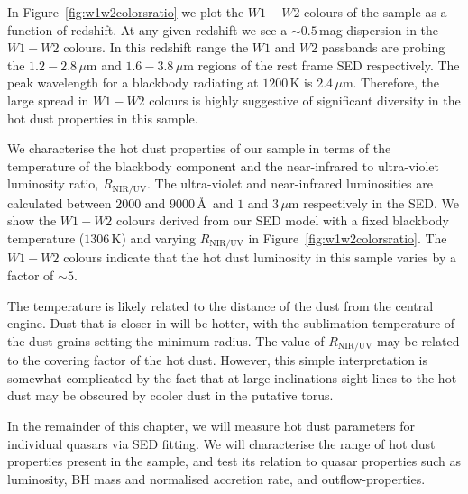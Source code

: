 In Figure~\ref{fig:w1w2colorsratio} we plot the $W1 - W2$ colours of the sample as a function of redshift. 
At any given redshift we see a $\sim 0.5$\,mag dispersion in the $W1-W2$ colours. 
In this redshift range the $W1$ and $W2$ passbands are probing the $1.2 - 2.8$\,$\mu$m and $1.6 - 3.8$\,$\mu$m regions of the rest frame SED respectively. 
The peak wavelength for a blackbody radiating at $1200$\,K is $2.4$\,$\mu$m.
Therefore, the large spread in $W1-W2$ colours is highly suggestive of significant diversity in the hot dust properties in this sample. 

We characterise the hot dust properties of our sample in terms of the temperature of the blackbody component and the near-infrared to ultra-violet luminosity ratio, $R_{\text{NIR/UV}}$. 
The ultra-violet and near-infrared luminosities are calculated between $2000$ and $9000$\,\AA\, and $1$ and $3$\,$\mu$m respectively in the SED.
We show the $W1-W2$ colours derived from our SED model with a fixed blackbody temperature ($1306$\,K) and varying $R_{\text{NIR/UV}}$ in Figure~\ref{fig:w1w2colorsratio}.
The $W1-W2$ colours indicate that the hot dust luminosity in this sample varies by a factor of $\sim5$. 

The temperature is likely related to the distance of the dust from the central engine.
Dust that is closer in will be hotter, with the sublimation temperature of the dust grains setting the minimum radius.  
The value of $R_{\text{NIR/UV}}$ may be related to the covering factor of the hot dust. 
However, this simple interpretation is somewhat complicated by the fact that at large inclinations sight-lines to the hot dust may be obscured by cooler dust in the putative torus. 

In the remainder of this chapter, we will measure hot dust parameters for individual quasars via SED fitting. 
We will characterise the range of hot dust properties present in the sample, and test its relation to quasar properties such as luminosity, BH mass and normalised accretion rate, and outflow-properties. 

